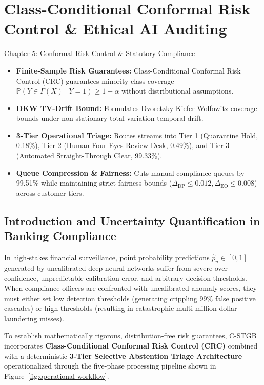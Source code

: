 \chapter{Class-Conditional Conformal Risk Control \& Ethical AI Auditing}
\label{ch:conformal}

\begin{takeawaybox}{Chapter 5: Conformal Risk Control \& Statutory Compliance}
\begin{itemize}\setlength{\itemsep}{1pt}
  \item \textbf{Finite-Sample Risk Guarantees:} Class-Conditional Conformal Risk Control (CRC) guarantees minority class coverage $\mathbb{P}(Y \in \Gamma(X) \mid \mbox{$Y=1$}) \ge 1 - \alpha$ without distributional assumptions.
  \item \textbf{DKW TV-Drift Bound:} Formulates Dvoretzky-Kiefer-Wolfowitz coverage bounds under non-stationary total variation temporal drift.
  \item \textbf{3-Tier Operational Triage:} Routes streams into Tier 1 (Quarantine Hold, 0.18\%), Tier 2 (Human Four-Eyes Review Desk, 0.49\%), and Tier 3 (Automated Straight-Through Clear, 99.33\%).
  \item \textbf{Queue Compression \& Fairness:} Cuts manual compliance queues by 99.51\% while maintaining strict fairness bounds ($\Delta_{\text{DP}} \le 0.012, \Delta_{\text{EO}} \le 0.008$) across customer tiers.
\end{itemize}
\end{takeawaybox}


\section{Introduction and Uncertainty Quantification in Banking Compliance}
In high-stakes financial surveillance, point probability predictions $\hat{p}_u \in [0, 1]$ generated by uncalibrated deep neural networks suffer from severe over-confidence, unpredictable calibration error, and arbitrary decision thresholds. When compliance officers are confronted with uncalibrated anomaly scores, they must either set low detection thresholds (generating crippling 99\% false positive cascades) or high thresholds (resulting in catastrophic multi-million-dollar laundering misses).

To establish mathematically rigorous, distribution-free risk guarantees, C-STGB incorporates \textbf{Class-Conditional Conformal Risk Control (CRC)} combined with a deterministic \textbf{3-Tier Selective Abstention Triage Architecture} operationalized through the five-phase processing pipeline shown in Figure~\ref{fig:operational-workflow}.

